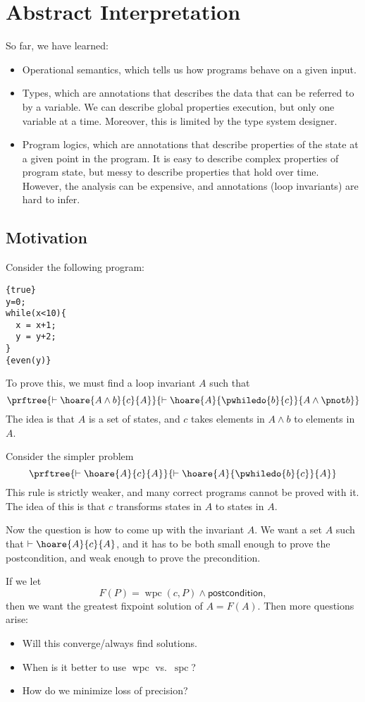 \documentclass[class=scrartcl]{standalone}
\begin{document}
\chapter{Abstract Interpretation}
So far, we have learned:
\begin{itemize}
  \item Operational semantics, which tells us
        how programs behave on a given input.
  \item Types, which are annotations that describes the data
        that can be referred to by a variable.
        We can describe global properties execution,
        but only one variable at a time.
        Moreover, this is limited by the type system designer.
  \item Program logics, which are annotations that describe
        properties of the state at a given point in the program.
        It is easy to describe complex properties of program state,
        but messy to describe properties that hold over time.
        However, the analysis can be expensive,
        and annotations (loop invariants) are hard to infer.
\end{itemize}

\section{Motivation}
Consider the following program:
\begin{verbatim}
{true}
y=0;
while(x<10){
  x = x+1;
  y = y+2;
}
{even(y)}
\end{verbatim}
To prove this, we must find a loop invariant \(A\) such that
\[
  \prftree{\vdash \hoare{A \land b}{c}{A}}
          {\vdash \hoare{A}{\pwhiledo{b}{c}}{A \land \pnot b}}
\]
The idea is that \(A\) is a set of states,
and \(c\) takes elements in \(A \land b\)
to elements in \(A\).

Consider the simpler problem
\[
  \prftree{\vdash \hoare{A}{c}{A}}
          {\vdash \hoare{A}{\pwhiledo{b}{c}}{A}}
\]
This rule is strictly weaker, and many correct programs
cannot be proved with it.
The idea of this is that \(c\) transforms states in \(A\) to states in \(A\).

Now the question is how to come up with the invariant \(A\).
We want a set \(A\) such that \(\vdash \hoare{A}{c}{A}\),
and it has to be both small enough to prove the postcondition,
and weak enough to prove the precondition.

If we let
\[
  F(P) = \operatorname{wpc}(c, P) \land \textsf{postcondition},
\]
then we want the greatest fixpoint solution of \(A = F(A)\).
Then more questions arise:
\begin{itemize}
  \item Will this converge/always find solutions.
  \item When is it better to use \(\operatorname{wpc}\) vs.\ \(\operatorname{spc}\)?
  \item How do we minimize loss of precision?
\end{itemize}
\end{document}
